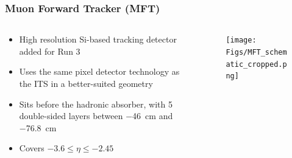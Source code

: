 \documentclass[11pt]{beamer}
\begin{document}
\begin{frame}
    \frametitle{Muon Forward Tracker (MFT)}

    \begin{columns}[c]
        \begin{column}{0.5\textwidth}
            \begin{itemize}
                \item High resolution Si-based tracking detector added for Run 3
                \item Uses the same pixel detector technology as the ITS in a better-suited geometry
                \item Sits before the hadronic absorber, with 5 double-sided layers between \SI{-46}{\centi\metre} and \SI{-76.8}{\centi\metre}
                \item Covers $-3.6\leq\eta\leq -2.45$
            \end{itemize}
        \end{column}

        \begin{column}{0.5\textwidth}
            \begin{figure}[h]
                \begin{center}
                    \texttt{[image: Figs/MFT\_schematic\_cropped.png]}
                \end{center}
            \end{figure}
        \end{column}
    \end{columns}

\end{frame}
\end{document}
